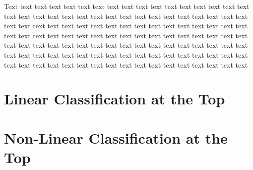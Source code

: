 \documentclass{Thesis}
\begin{document}
Text text text text text text text text text text text text text text text text text text text text text text text text text text text text text text text text text text text text text text text text text text text text text text text text text text text text text text text text text text text text text text text text text text text text text text text text text text text text text text text text text text text text text text text text text text text text text text text text text text text text text text text text text text text text text text text text text text text text text text text

\chapter{Linear Classification at the Top}

\chapter{Non-Linear Classification at the Top}

\cleardoublepage
{}
{}


\end{document}
